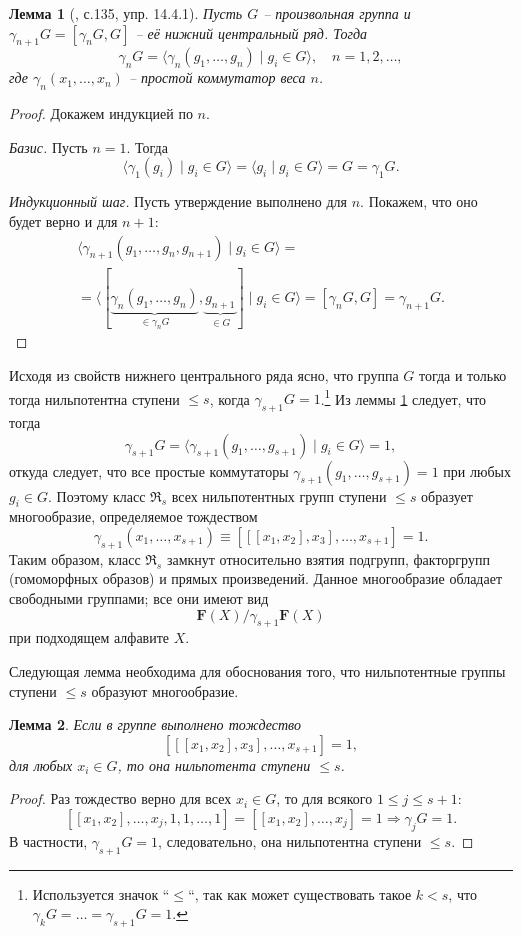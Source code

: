 \documentclass{article}
\newtheorem{lemma}{Лемма}[section]
\begin{document}
\begin{lemma}[\cite{kargapolov}, с.135, упр. 14.4.1] \label{fgsas}
    Пусть $G$ -- произвольная группа и $\gamma_{n + 1} G = [\gamma_nG, G]$ -- её нижний центральный ряд. Тогда
    \[
        \gamma_n G = \langle \gamma_n(g_1,\ldots, g_n) \mid g_i \in G \rangle, \quad n = 1,2, \ldots,
    \]
    где $\gamma_n(x_1, \ldots, x_n)$ -- простой коммутатор веса $n$.
\end{lemma}
\begin{proof}
    Докажем индукцией по $n$.

    \textit{Базис.} Пусть $n = 1$. Тогда $$ \langle \gamma_1(g_i) \mid g_i \in G \rangle = \langle g_i \mid g_i \in G \rangle = G = \gamma_1 G.$$

    \textit{Индукционный шаг.} Пусть утверждение выполнено для $n$. Покажем, что оно будет верно и для $n + 1$:
    \begin{gather*}
        \langle \gamma_{n + 1}(g_1, \ldots, g_n, g_{n + 1}) \mid g_i \in G \rangle = \\
        = \langle [\underbrace{\gamma_n(g_1, \ldots, g_n)}_{\in \gamma_n G}, \underbrace{g_{n+1}}_{\in G}] \mid g_i \in G \rangle = [\gamma_nG, G] = \gamma_{n + 1}G.
    \end{gather*}
\end{proof}

Исходя из свойств нижнего центрального ряда ясно, что группа $G$ тогда и только тогда нильпотентна ступени $\leqslant s$, когда $\gamma_{s + 1}G = 1$.\footnote{Используется значок ``$\leqslant$``, так как может существовать такое $k < s$, что $\gamma_k G = \ldots = \gamma_{s + 1}G = 1$.} Из леммы \ref{fgsas} следует, что тогда $$ \gamma_{s + 1}G = \langle \gamma_{s + 1}(g_1, \ldots, g_{s + 1}) \mid g_i \in G \rangle = 1, $$
откуда следует, что все простые коммутаторы $\gamma_{s + 1}(g_1, \ldots, g_{s + 1}) = 1$ при любых $g_i \in G$. Поэтому класс $\mathfrak{R}_s$ всех нильпотентных групп ступени $\leqslant s$ образует многообразие, определяемое тождеством
\[
    \gamma_{s + 1}(x_1, \ldots, x_{s + 1}) \equiv [[[x_1, x_2], x_3], \ldots, x_{s + 1}] = 1.
\]
Таким образом, класс $\mathfrak{R}_s$ замкнут относительно взятия подгрупп, факторгрупп (гомоморфных образов) и прямых произведений.
Данное многообразие обладает свободными группами; все они имеют вид $$ \mathbf{F}(X) / \gamma_{s + 1} \mathbf{F}(X) $$ при подходящем алфавите $X$.

Следующая лемма необходима для обоснования того, что нильпотентные группы ступени $\leqslant s$ образуют многообразие.
\begin{lemma}
    Если в группе выполнено тождество $$ [[[x_1, x_2], x_3], \ldots, x_{s + 1}] = 1, $$ для любых $x_i \in G$, то она нильпотента ступени $\leqslant s$.
\end{lemma}
\begin{proof}
    Раз тождество верно для всех $x_i \in G$, то для всякого $ 1 \leqslant j \leqslant s + 1$:
    \[
        [[x_1, x_2], \ldots, x_j, 1, 1, \ldots, 1] = [[x_1, x_2], \ldots, x_j] = 1 \Rightarrow \gamma_{j}G = 1.
    \]
    В частности, $\gamma_{s + 1}G = 1$, следовательно, она нильпотентна ступени $\leqslant s$.
\end{proof}
\end{document}
